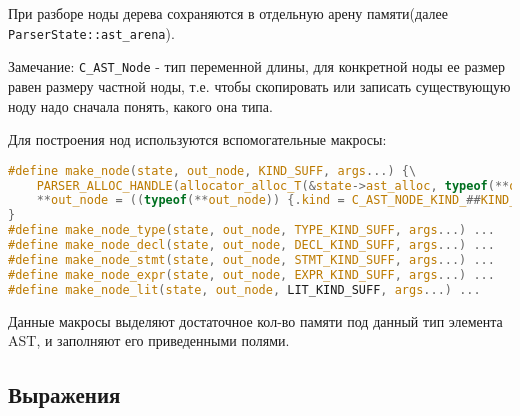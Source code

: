 При разборе ноды дерева сохраняются в отдельную арену памяти(далее \verb|ParserState::ast_arena|).

Замечание: \verb|C_AST_Node| - тип переменной длины, для конкретной ноды ее размер равен размеру частной ноды,
т.е. чтобы скопировать или записать существующую ноду надо сначала понять, какого она типа.

Для построения нод используются вспомогательные макросы:
\begin{lstlisting}[language=c]
#define make_node(state, out_node, KIND_SUFF, args...) {\
    PARSER_ALLOC_HANDLE(allocator_alloc_T(&state->ast_alloc, typeof(**out_node), out_node));\
    **out_node = ((typeof(**out_node)) {.kind = C_AST_NODE_KIND_##KIND_SUFF, ##args });\
}
#define make_node_type(state, out_node, TYPE_KIND_SUFF, args...) ...
#define make_node_decl(state, out_node, DECL_KIND_SUFF, args...) ...
#define make_node_stmt(state, out_node, STMT_KIND_SUFF, args...) ...
#define make_node_expr(state, out_node, EXPR_KIND_SUFF, args...) ...
#define make_node_lit(state, out_node, LIT_KIND_SUFF, args...) ...
\end{lstlisting}

Данные макросы выделяют достаточное кол-во памяти под данный тип элемента AST, и заполняют его приведенными полями.







\clearpage
\subsection{Выражения}

